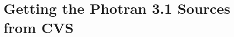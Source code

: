 \documentclass[10pt,letterpaper]{report}
\begin{document}
%

\appendix

\chapter{Getting the Photran 3.1 Sources from CVS}
\vspace{0.5em}


%

%

%

\end{document}
